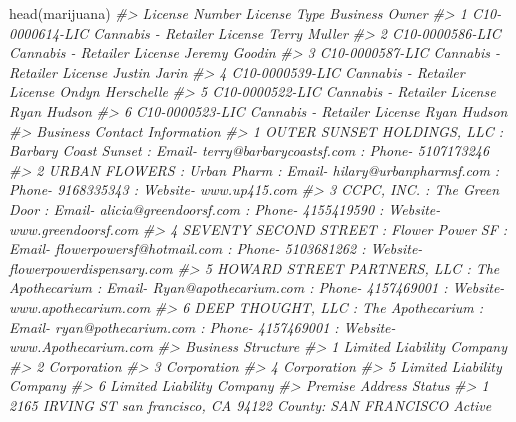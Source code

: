 \documentclass[
  12pt,
]{book}
\newenvironment{Shaded}{\begin{snugshade}}{\end{snugshade}}
\newcommand{\CommentTok}[1]{\textcolor[rgb]{0.37,0.37,0.37}{\textit{#1}}}
\newcommand{\FunctionTok}[1]{\textcolor[rgb]{0,0,0}{#1}}
\newcommand{\NormalTok}[1]{#1}
\begin{document}
\begin{Shaded}
\begin{Highlighting}[]
\FunctionTok{head}\NormalTok{(marijuana)}
\CommentTok{\#\textgreater{}    License Number                License Type   Business Owner}
\CommentTok{\#\textgreater{} 1 C10{-}0000614{-}LIC Cannabis {-} Retailer License     Terry Muller}
\CommentTok{\#\textgreater{} 2 C10{-}0000586{-}LIC Cannabis {-} Retailer License    Jeremy Goodin}
\CommentTok{\#\textgreater{} 3 C10{-}0000587{-}LIC Cannabis {-} Retailer License     Justin Jarin}
\CommentTok{\#\textgreater{} 4 C10{-}0000539{-}LIC Cannabis {-} Retailer License Ondyn Herschelle}
\CommentTok{\#\textgreater{} 5 C10{-}0000522{-}LIC Cannabis {-} Retailer License      Ryan Hudson}
\CommentTok{\#\textgreater{} 6 C10{-}0000523{-}LIC Cannabis {-} Retailer License      Ryan Hudson}
\CommentTok{\#\textgreater{}                                                                                                           Business Contact Information}
\CommentTok{\#\textgreater{} 1                             OUTER SUNSET HOLDINGS, LLC  : Barbary Coast Sunset : Email{-} terry@barbarycoastsf.com : Phone{-} 5107173246}
\CommentTok{\#\textgreater{} 2                           URBAN FLOWERS  : Urban Pharm : Email{-} hilary@urbanpharmsf.com : Phone{-} 9168335343 : Website{-} www.up415.com}
\CommentTok{\#\textgreater{} 3                      CCPC, INC.  : The Green Door : Email{-} alicia@greendoorsf.com : Phone{-} 4155419590 : Website{-} www.greendoorsf.com}
\CommentTok{\#\textgreater{} 4 SEVENTY SECOND STREET  : Flower Power SF : Email{-} flowerpowersf@hotmail.com : Phone{-} 5103681262 : Website{-} flowerpowerdispensary.com}
\CommentTok{\#\textgreater{} 5   HOWARD STREET PARTNERS, LLC  : The Apothecarium : Email{-} Ryan@apothecarium.com : Phone{-} 4157469001 : Website{-} www.apothecarium.com}
\CommentTok{\#\textgreater{} 6              DEEP THOUGHT, LLC  : The Apothecarium : Email{-} ryan@pothecarium.com : Phone{-} 4157469001 : Website{-} www.Apothecarium.com}
\CommentTok{\#\textgreater{}          Business Structure}
\CommentTok{\#\textgreater{} 1 Limited Liability Company}
\CommentTok{\#\textgreater{} 2               Corporation}
\CommentTok{\#\textgreater{} 3               Corporation}
\CommentTok{\#\textgreater{} 4               Corporation}
\CommentTok{\#\textgreater{} 5 Limited Liability Company}
\CommentTok{\#\textgreater{} 6 Limited Liability Company}
\CommentTok{\#\textgreater{}                                                 Premise Address Status}
\CommentTok{\#\textgreater{} 1  2165 IRVING ST san francisco, CA 94122 County: SAN FRANCISCO Active}

\end{Highlighting}
\end{Shaded}
\end{document}
